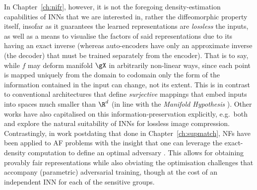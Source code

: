 %
In Chapter~\ref{ch:nifr}, however, it is not the foregoing density-estimation capabilities of
\acp{INN} that we are interested in, rather the diffeomorphic property itself, insofar as it
guarantees the learned representations are \emph{lossless} \wrt{} the inputs, as well as a means to
visualise the factors of said representations due to its having an exact inverse (whereas
auto-encoders have only an approximate inverse (the decoder) that must be trained separately from
the encoder).
%
That is to say, while \(f\) may deform manifold \(\gX\) in arbitrarily non-linear ways, since each
point is mapped uniquely from the domain to codomain only the form of the information contained in
the input can change, not its extent. 
%
This is in contrast to conventional architectures that define \emph{surjective} mappings that embed
inputs into spaces much smaller than \(\R^d\) (in line with the \emph{Manifold Hypothesis}
\citep{fefferman2016testing}).
%
Other works have also capitalised on this information-preservation explicitly, e.g.\ both
\citet{hoogeboom2019integer} and \citet{xie2021enhanced} explore the natural suitability of
\acp{INN} for lossless image compression.
%
Contrastingly, in work postdating that done in Chapter~\ref{ch:supmatch}, \acp{NF} have been
applied to \ac{AF} problems with the insight that one can leverage the exact-density computation to
define an optimal adversary \citep{balunovic2021fair, cerrato2022fair}. 
%
This allows for obtaining provably fair representations while also obviating the optimisation
challenges that accompany (parametric) adversarial training, though at the cost of an independent
\ac{INN} for each of the sensitive groups.

